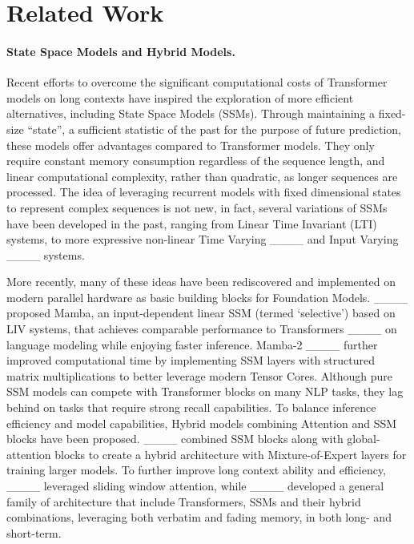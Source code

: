 \section{Related Work}
\paragraph{State Space Models and Hybrid Models.}


Recent efforts to overcome the significant computational costs of Transformer models on long contexts have inspired the exploration of more efficient alternatives, including State Space Models (SSMs). Through maintaining a fixed-size ``state'', a sufficient statistic of the past for the purpose of future prediction, these models offer advantages compared to Transformer models. They only require constant memory consumption regardless of the sequence length, and linear computational complexity, rather than quadratic, as longer sequences are processed.  
The idea of leveraging recurrent models with fixed dimensional states to represent complex sequences is not new, in fact, several variations of SSMs have been developed in the past, ranging from Linear Time Invariant (LTI) systems, to more expressive non-linear Time Varying ____ and Input Varying ____ systems.

More recently, many of these ideas have been rediscovered and implemented on modern parallel hardware as basic building blocks for Foundation Models. 
____ proposed Mamba, an input-dependent linear SSM (termed `selective') based on LIV systems, that achieves comparable performance to Transformers ____ on language modeling while enjoying faster inference. 
Mamba-2 ____ further improved computational time by implementing SSM layers with structured matrix multiplications to better leverage modern Tensor Cores.
Although pure SSM models can compete with Transformer blocks on many NLP tasks, they lag behind on tasks that require strong recall capabilities. To balance inference efficiency and model capabilities, Hybrid models combining Attention and SSM blocks have been proposed.
____ combined SSM blocks along with global-attention blocks to create a hybrid architecture with Mixture-of-Expert layers for training larger models. To further improve long context ability and efficiency, ____ leveraged sliding window attention, while ____ developed a general family of architecture that include Transformers, SSMs and their hybrid combinations, leveraging both verbatim and fading memory, in both long- and short-term.
\color{black}

